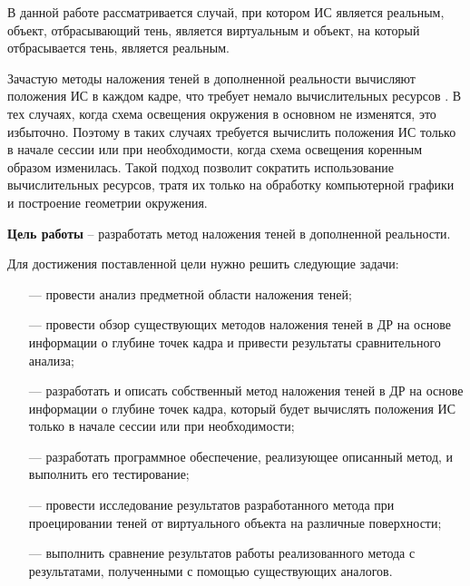 В данной работе рассматривается случай, при котором ИС является реальным, объект, отбрасывающий тень, является виртуальным и объект, на который отбрасывается тень, является реальным.

Зачастую методы наложения теней в дополненной реальности вычисляют положения ИС в каждом кадре, что требует немало вычислительных ресурсов \cite{osti2019real}. В тех случаях, когда схема освещения окружения в основном не изменятся, это избыточно. Поэтому в таких случаях требуется вычислить положения ИС только в начале сессии или при необходимости, когда схема освещения коренным образом изменилась. Такой подход позволит сократить использование вычислительных ресурсов, тратя их только на обработку компьютерной графики и построение геометрии окружения.

\textbf{Цель работы} -- разработать метод наложения теней в дополненной реальности.

Для достижения поставленной цели нужно решить следующие задачи:

\begin{itemize}
	\item[---] провести анализ предметной области наложения теней;
	\item[---] провести обзор существующих методов наложения теней в ДР на основе информации о глубине точек кадра и привести результаты сравнительного анализа;
	\item[---] разработать и описать собственный метод наложения теней в ДР на основе информации о глубине точек кадра, который будет вычислять положения ИС только в начале сессии или при необходимости;
	\item[---] разработать программное обеспечение, реализующее описанный метод, и выполнить его тестирование;
	\item[---] провести исследование результатов разработанного метода при проецировании теней от виртуального объекта на различные поверхности;
	\item[---] выполнить сравнение результатов работы реализованного метода с результатами, полученными с помощью существующих аналогов.
\end{itemize}